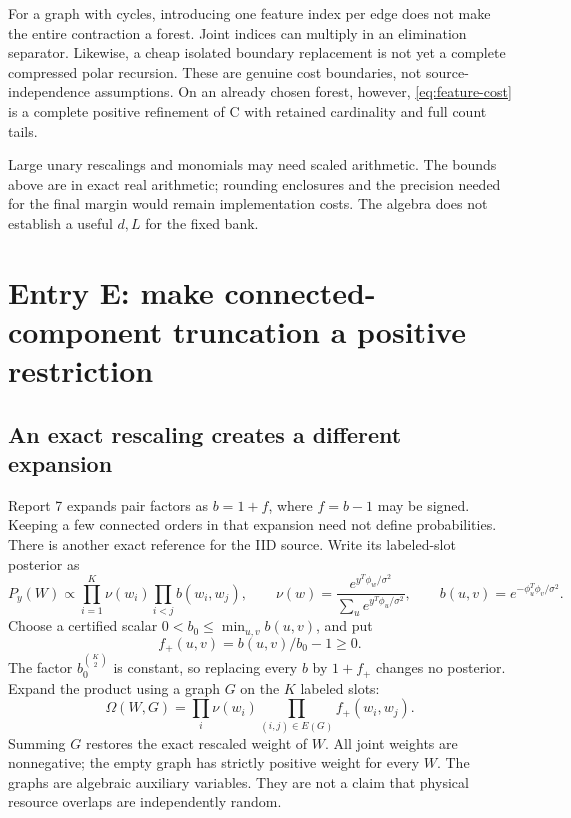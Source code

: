 \documentclass[10pt,a4paper]{article}
\begin{document}
For a graph with cycles, introducing one feature index per edge does not make the entire contraction a
forest. Joint indices can multiply in an elimination separator. Likewise, a cheap isolated boundary
replacement is not yet a complete compressed polar recursion. These are genuine cost boundaries, not
source-independence assumptions. On an already chosen forest, however, \eqref{eq:feature-cost} is a complete
positive refinement of C with retained cardinality and full count tails.

Large unary rescalings and monomials may need scaled arithmetic. The bounds above are in exact real
arithmetic; rounding enclosures and the precision needed for the final margin would remain implementation
costs. The algebra does not establish a useful $d,L$ for the fixed bank.

\clearpage
\section{Entry E: make connected-component truncation a positive restriction}
\label{sec:positive-clusters}
\subsection{An exact rescaling creates a different expansion}
Report 7 expands pair factors as $b=1+f$, where $f=b-1$ may be signed. Keeping a few connected orders
in that expansion need not define probabilities. There is another exact reference for the IID source.
Write its labeled-slot posterior as
\[
 P_y(W)\propto\prod_{i=1}^K\nu(w_i)\prod_{i<j}b(w_i,w_j),\qquad
 \nu(w)=\frac{e^{y^T\phi_w/\sigma^2}}{\sum_u e^{y^T\phi_u/\sigma^2}},\qquad
 b(u,v)=e^{-\phi_u^T\phi_v/\sigma^2}.
\]
Choose a certified scalar $0<b_0\leq\min_{u,v}b(u,v)$, and put
\[
 f_+(u,v)=b(u,v)/b_0-1\geq0.
\]
The factor $b_0^{\binom K2}$ is constant, so replacing every $b$ by $1+f_+$ changes no posterior.
Expand the product using a graph $G$ on the $K$ labeled slots:
\begin{equation}
 \Omega(W,G)=\prod_i\nu(w_i)\prod_{(i,j)\in E(G)}f_+(w_i,w_j).
 \label{eq:positive-graph}
\end{equation}
Summing $G$ restores the exact rescaled weight of $W$. All joint weights are nonnegative; the empty graph
has strictly positive weight for every $W$. The graphs are algebraic auxiliary variables. They are not a
claim that physical resource overlaps are independently random.
\end{document}
